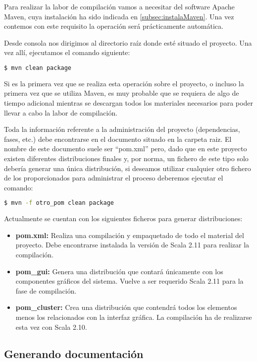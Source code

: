 Para realizar la labor de compilación vamos a necesitar del software Apache Maven, cuya instalación ha sido indicada en \ref{subsec:instalaMaven}. Una vez contemos con este requisito la operación será prácticamente automática.

Desde consola nos dirigimos al directorio raíz donde esté situado el proyecto. Una vez allí, ejecutamos el comando siguiente:

\begin{lstlisting}[language=bash]
$ mvn clean package
\end{lstlisting}

Si es la primera vez que se realiza esta operación sobre el proyecto, o incluso la primera vez que se utiliza Maven, es muy probable que se requiera de algo de tiempo adicional mientras se descargan todos los materiales necesarios para poder llevar a cabo la labor de compilación.

Toda la información referente a la administración del proyecto (dependencias, fases, etc.) debe encontrarse en el documento situado en la carpeta raiz. El nombre de este documento suele ser ``pom.xml'' pero, dado que en este proyecto existen diferentes distribuciones finales y, por norma, un fichero de este tipo solo debería generar una única distribución, si deseamos utilizar cualquier otro fichero de los proporcionados para administrar el proceso deberemos ejecutar el comando:

\begin{lstlisting}[language=bash]
$ mvn -f otro_pom clean package
\end{lstlisting}

Actualmente se cuentan con los siguientes ficheros para generar distribuciones:
\begin{itemize}
\item \textbf{pom.xml:} Realiza una compilación y empaquetado de todo el material del proyecto. Debe encontrarse instalada la versión de Scala 2.11 para realizar la compilación.
\item \textbf{pom\_gui:} Genera una distribución que contará únicamente con los componentes gráficos del sistema. Vuelve a ser requerido Scala 2.11 para la fase de compilación.
\item \textbf{pom\_cluster:} Crea una distribución que contendrá todos los elementos menos los relacionados con la interfaz gráfica. La compilación ha de realizarse esta vez con Scala 2.10.
\end{itemize}

\subsection{Generando documentación}\label{subsec:documentacion}


